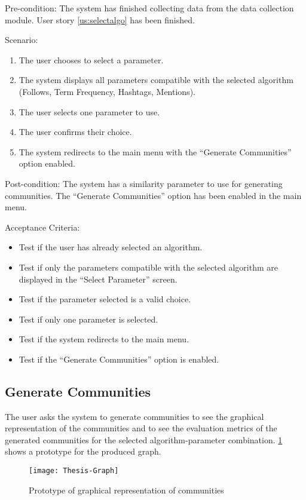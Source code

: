 Pre-condition: The system has finished collecting data from the data collection module. User story \ref{us:selectalgo} has been finished.


Scenario:
\begin{enumerate}
	\item The user chooses to select a parameter.
	\item The system displays all parameters compatible with the selected algorithm (Follows, Term Frequency, Hashtags, Mentions).
	\item The user selects one parameter to use.
	\item The user confirms their choice.
	\item The system redirects to the main menu with the ``Generate Communities'' option enabled.
\end{enumerate}


Post-condition: The system has a similarity parameter to use for generating communities. The ``Generate Communities'' option
has been enabled in the main menu.


Acceptance Criteria:
\begin{itemize}
	\item Test if the user has already selected an algorithm.
	\item Test if only the parameters compatible with the selected algorithm are displayed in the ``Select Parameter'' screen.
	\item Test if the parameter selected is a valid choice.
	\item Test if only one parameter is selected.
	\item Test if the system redirects to the main menu.
	\item Test if the ``Generate Communities'' option is enabled.
\end{itemize}


\subsection{Generate Communities}
\label{us:gencom}


The user asks the system to generate communities to see the graphical representation of the communities and to see the 
evaluation metrics of the generated communities for the selected algorithm-parameter combination. \ref{fig:graph} shows a prototype for the produced graph.

\begin{figure}
	\centering
	\texttt{[image: Thesis-Graph]}
	\caption{Prototype of graphical representation of communities}
	\label{fig:graph}	
\end{figure}

